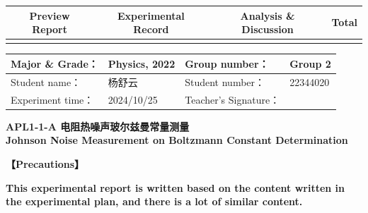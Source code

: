 


\begin{table}
	\renewcommand\arraystretch{1.7}
	\begin{tabularx}{\textwidth}{
			|X|X|X|X
			|X|X|X|X|}
		\hline
		\multicolumn{2}{|c|}{Preview Report}&\multicolumn{2}{|c|}{Experimental Record}&\multicolumn{2}{|c|}{Analysis \& Discussion}&\multicolumn{2}{|c|}{\Large\textbf{Total}}\\
		\hline
		\LARGE & & \LARGE & & \LARGE & & \LARGE & \\
		\hline
	\end{tabularx}
\end{table}


\begin{table}
	\renewcommand\arraystretch{1.7}
	\begin{tabularx}{\textwidth}{|X|X|X|X|}
		\hline
		Major \& Grade： & Physics, 2022 &Group number： & Group 2\\
		\hline
		Student name： & 杨舒云 & Student number： & 22344020  \\
		\hline
		Experiment time： & 2024/10/25 & Teacher's Signature： & \\
		\hline
	\end{tabularx}
\end{table}


\begin{center}
	\huge \textbf{APL1-1-A \quad 电阻热噪声玻尔兹曼常量测量\\Johnson Noise Measurement on Boltzmann Constant Determination}
\end{center}


\textbf{【Precautions】}

\textbf{This experimental report is written based on the content written in the experimental plan, and there is a lot of similar content.}

